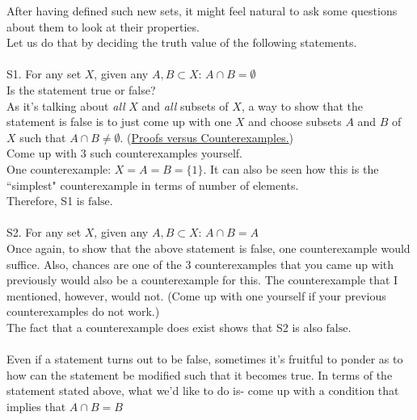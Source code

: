 \hrulefill
{}

\hrulefill

After having defined such new sets, it might feel natural to ask some questions about them to look at their properties.\\
Let us do that by deciding the truth value of the following statements.\\~\\
S1. For any set $X$, given any $A, B \subset X$: $A\cap B = \emptyset$\\
Is the statement true or false?\\
As it's talking about \textit{all} $X$ and \textit{all} subsets of $X$, a way to show that the statement is false is to just come up with one $X$ and choose subsets $A$ and $B$ of $X$ such that $A\cap B\neq \emptyset$. (\hyperref[sec:pvsce]{Proofs versus Counterexamples.})\\
Come up with 3 such counterexamples yourself.\\
One counterexample: $X=A=B=\{1\}$. It can also be seen how this is the ``simplest" counterexample in terms of number of elements.\\
Therefore, S1 is $\boxed{\text{false.}}$\\~\\
S2. For any set $X$, given any $A, B \subset X$: $A\cap B = A$\\
Once again, to show that the above statement is false, one counterexample would suffice. Also, chances are one of the 3 counterexamples that you came up with previously would also be a counterexample for this. The counterexample that I mentioned, however, would not.  (Come up with one yourself if your previous counterexamples do not work.)\\
The fact that a counterexample does exist shows that S2 is also $\boxed{\text{false.}}$\\~\\
Even if a statement turns out to be false, sometimes it's fruitful to ponder as to how can the statement be modified such that it becomes true. In terms of the statement stated above, what we'd like to do is- come up with a condition that implies that $A\cap B = B$\\~\\
